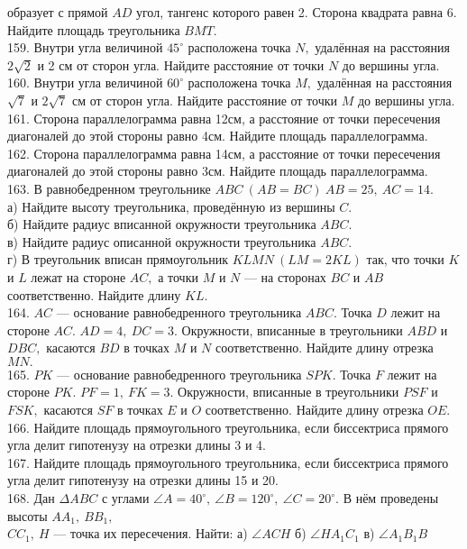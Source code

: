 образует с прямой $AD$ угол, тангенс которого равен 2. Сторона квадрата равна 6. Найдите площадь треугольника $BMT.$\\
159. Внутри угла величиной $45^\circ$ расположена точка $N,$ удалённая на расстояния $2\sqrt{2}$ и 2 см от сторон угла.
Найдите расстояние от точки $N$ до вершины угла.\\
160. Внутри угла величиной $60^\circ$ расположена точка $M,$ удалённая на расстояния $\sqrt{7}$ и $2\sqrt{7}$ см от
сторон угла. Найдите расстояние от точки $M$ до вершины угла.\\
161. Сторона параллелограмма равна 12см, а расстояние от точки пересечения диагоналей до этой стороны равно 4см. Найдите площадь параллелограмма.\\
162. Сторона параллелограмма равна 14см, а расстояние от точки пересечения диагоналей до этой стороны равно 3см. Найдите площадь параллелограмма.\\
163. В равнобедренном треугольнике $ABC\ (AB=BC)\ AB=25,\ AC=14.$\\
а) Найдите высоту треугольника, проведённую из вершины $C.$\\
б) Найдите радиус вписанной окружности треугольника $ABC.$\\
в) Найдите радиус описанной окружности треугольника $ABC.$\\
г) В треугольник вписан прямоугольник $KLMN\ (LM=2KL)$ так, что точки $K$ и $L$ лежат на стороне $AC,$ а точки $M$ и $N$ --- на сторонах $BC$ и $AB$ соответственно. Найдите длину $KL.$\\
164. $AC$ --- основание равнобедренного треугольника $ABC.$ Точка $D$ лежит на стороне $AC.$ $AD=4,\ DC=3.$ Окружности, вписанные в треугольники $ABD$ и $DBC,$ касаются $BD$ в точках $M$ и $N$ соответственно. Найдите длину отрезка $MN.$\\
165. $PK$ --- основание равнобедренного треугольника $SPK.$ Точка $F$ лежит на стороне $PK.$ $PF=1,\ FK=3.$ Окружности, вписанные в треугольники $PSF$ и $FSK,$ касаются $SF$ в точках $E$ и $O$ соответственно. Найдите длину отрезка $OE.$\\
166. Найдите площадь прямоугольного треугольника, если биссектриса прямого угла делит гипотенузу на отрезки длины 3 и 4.\\
167. Найдите площадь прямоугольного треугольника, если биссектриса прямого угла делит гипотенузу на отрезки длины 15 и 20.\\
168. Дан $\Delta ABC$ с углами $\angle A=40^\circ,\ \angle B=120^\circ,\ \angle C=20^\circ.$ В нём проведены высоты $AA_1,\ BB_1,$\\$ CC_1,\ H$ --- точка их пересечения. Найти: а) $\angle ACH$ б) $\angle HA_1C_1$ в) $\angle A_1B_1B$\\
